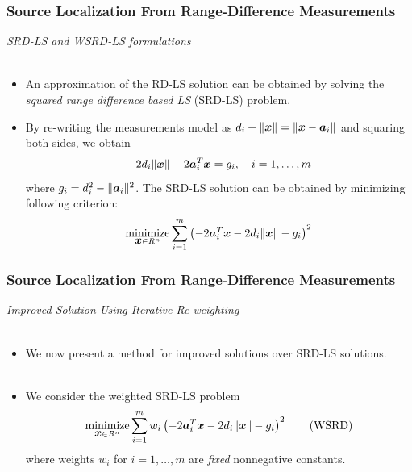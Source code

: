 \documentclass [t] {beamer} %
\begin{document}
\begin{frame} %
\frametitle{Source Localization From Range-Difference Measurements} %
{\large \textit{SRD-LS and WSRD-LS formulations}}
\\~\\
\normalsize
\begin{itemize}
\item 
An approximation of the RD-LS solution can be obtained by solving the \textit{squared range difference based LS} (SRD-LS) problem. \\ %
\item 
By re-writing the measurements model as $d_i+\|\mbox{\boldmath$x$}\|=\|\mbox{\boldmath$x$}-\mbox{\boldmath$a$}_i\|$ and squaring both sides, we obtain
  \begin{equation} 
  \nonumber
-2d_i\|\mbox{\boldmath$x$}\|-2\mbox{\boldmath$a$}_i^T\mbox{\boldmath$x$}=g_i, \quad i=1,\ldots,m
 \end{equation}
 where $g_i=d_i^2-\|\mbox{\boldmath$a$}_i\|^2$.  
The SRD-LS solution can be obtained by minimizing following criterion:
 \begin{equation}
 \nonumber
\mathop{\mbox{minimize}}_{{\mbox{\boldmath$x$}} \in R^{n}} \sum_{i=1}^m \left(-2\mbox{\boldmath$a$}_i^T\mbox{\boldmath$x$}-2d_i\|\mbox{\boldmath$x$}\|-g_i\right)^2 
\end{equation}

 \end{itemize}
\end{frame}


\begin{frame} %
\frametitle{Source Localization From Range-Difference Measurements} 
{\large \textit{Improved Solution Using Iterative Re-weighting}} \\~\\
\normalsize
\begin{itemize}
\item 
We now present a method for improved solutions over SRD-LS solutions. 
\\~\\
\item 
We consider the weighted SRD-LS problem
\begin{equation} \label{WSRD}
\mathop{\mbox{minimize}}_{{\mbox{\boldmath$x$}} \in R^n} \sum_{i=1}^m w_i\left(-2\mbox{\boldmath$a$}_i^T\mbox{\boldmath$x$}-2d_i\|\mbox{\boldmath$x$}\|-g_i\right)^2 \tag{WSRD}
\end{equation}
where weights $w_i$ for $i=1,\ldots,m$ are \textit{fixed} nonnegative constants. 
\end{itemize}
\end{frame}
\end{document}
